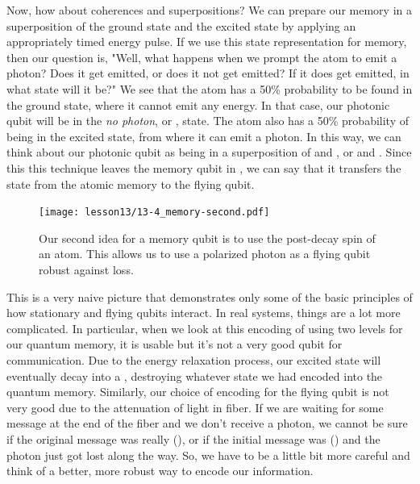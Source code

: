 Now, how about coherences and superpositions? We can prepare our memory in a superposition of the ground state and the excited state by applying an appropriately timed energy pulse. If we use this state representation for memory, then our question is, "Well, what happens when we prompt the atom to emit a photon? Does it get emitted, or does it not get emitted? If it does get emitted, in what state will it be?" We see that the atom has a 50\% probability to be found in the ground state, where it cannot emit any energy. In that case, our photonic qubit will be in the \emph{no photon}, or , state. The atom also has a 50\% probability of being in the excited state, from where it can emit a photon. In this way, we can think about our photonic qubit as being in a superposition of  and , or  and .
Since this this technique leaves the memory qubit in , we can say that it transfers the state \ket{+} from the atomic memory to the flying qubit. 


\begin{figure}[t]
    \centering
    \texttt{[image: lesson13/13-4\_memory-second.pdf]}
    \caption[Our second idea for memory]{Our second idea for a memory qubit is to use the post-decay spin of an atom. This allows us to use a polarized photon as a flying qubit robust against loss.}
    \label{fig:13-memory-second-idea}
\end{figure}

This is a very naive picture that demonstrates only some of the basic principles of how stationary and flying qubits interact. In real systems, things are a lot more complicated. In particular, when we look at this encoding of using two levels for our quantum memory, it is usable but it's not a very good qubit for communication. Due to the energy relaxation process, our excited state will eventually decay into a , destroying whatever state we had encoded into the quantum memory. Similarly, our choice of encoding for the flying qubit is not very good due to the attenuation of light in fiber. 
If we are waiting for some message at the end of the fiber and we don't receive a photon, we cannot be sure if the original message was really  (), or if the initial message was  () and the photon just got lost along the way. So, we have to be a little bit more careful and think of a better, more robust way to encode our information.

